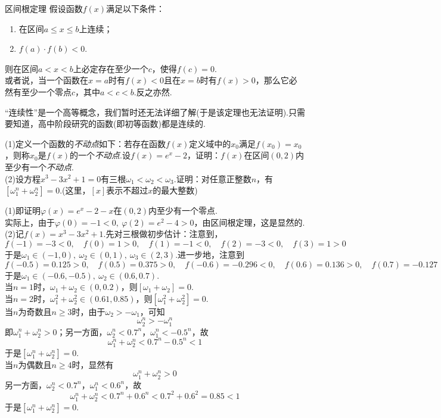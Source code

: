 \documentclass[lang=cn, zihao=5]{elegantbook}
\begin{document}
\begin{theorem}{区间根定理}
    假设函数$f(x)$满足以下条件：
    \begin{enumerate}
        \item 在区间$a \leq x \leq b$上连续；
        \item $f(a) \cdot f(b)<0$.
    \end{enumerate}
    则在区间$a<x<b$上必定存在至少一个$c$，使得$f(c)=0$.\\
    或者说，当一个函数在$x=a$时有$f(x)<0$且在$x=b$时有$f(x)>0$，那么它必然有至少一个零点$c$，其中$a<c<b$.反之亦然.
\end{theorem}
\begin{remark}
	“连续性”是一个高等概念，我们暂时还无法详细了解(于是该定理也无法证明).只需要知道，高中阶段研究的函数(即初等函数)都是连续的.
\end{remark}

\begin{example}
	(1)定义一个函数的\textit{不动点}如下：若存在函数$f(x)$定义域中的$x_0$满足$f(x_0)=x_0$，则称$x_0$是$f(x)$的一个\textit{不动点}.设$f(x)=e^x-2$，证明：$f(x)$在区间$(0,2)$内至少有一个\textit{不动点}. \\
	(2)设方程$x^3-3x^2+1=0$有三根$\omega _1 < \omega _2 < \omega _3$.证明：对任意正整数$n$，有$[\omega _1 ^n + \omega _2 ^n] = 0$.(这里，$[x]$表示不超过$x$的最大整数)
\end{example}
\begin{solution}
	(1)即证明$\varphi (x) = e^x-2-x$在$(0,2)$内至少有一个零点. \\
	实际上，由于$\varphi (0) = -1 < 0,~\varphi (2)=e^2-4 > 0$，由区间根定理，这是显然的. \\
	(2)记$f(x)=x^3-3x^2+1$.先对三根做初步估计：注意到，$$f(-1)=-3<0,\quad f(0)=1>0,\quad f(1)=-1<0,\quad f(2)=-3<0,\quad f(3)=1>0$$
	于是$\omega _1 \in (-1,0),~\omega _2 \in (0,1),~\omega _3 \in (2,3)$.进一步地，注意到$$f(-0.5)=0.125>0,\quad f(0.5)=0.375>0,\quad f(-0.6)=-0.296<0,\quad f(0.6)=0.136>0,\quad f(0.7)=-0.127$$
	于是$\omega _1 \in (-0.6,-0.5),~\omega _2 \in (0.6,0.7)$. \\
	当$n=1$时，$\omega _1 + \omega _2 \in (0,0.2)$，则$[\omega _1 + \omega _2]=0$. \\
	当$n=2$时，$\omega _1^2 + \omega _2^2 \in (0.61,0.85)$，则$[\omega _1^2 + \omega _2^2]=0$. \\
	当$n$为奇数且$n \geq 3$时，由于$\omega _2 > -\omega _1$，可知$$\omega _2^n > -\omega _1^n$$
	即$\omega _1 ^n + \omega _2 ^n >0$；另一方面，$\omega _2^n < 0.7^n$，$\omega _1 ^n < -0.5^n$，故$$\omega _1 ^n + \omega _2 ^n < 0.7^n - 0.5^n <1$$
	于是$[\omega _1 ^n + \omega _2 ^n] = 0$. \\
	当$n$为偶数且$n \geq 4$时，显然有$$\omega _1 ^n + \omega _2 ^n >0$$
	另一方面，$\omega _2^n < 0.7^n$，$\omega _1 ^n < 0.6^n$，故$$\omega _1 ^n + \omega _2 ^n < 0.7^n + 0.6^n < 0.7^2 + 0.6^2 = 0.85 < 1$$
	于是$[\omega _1 ^n + \omega _2 ^n] = 0$.
\end{solution}
\end{document}
